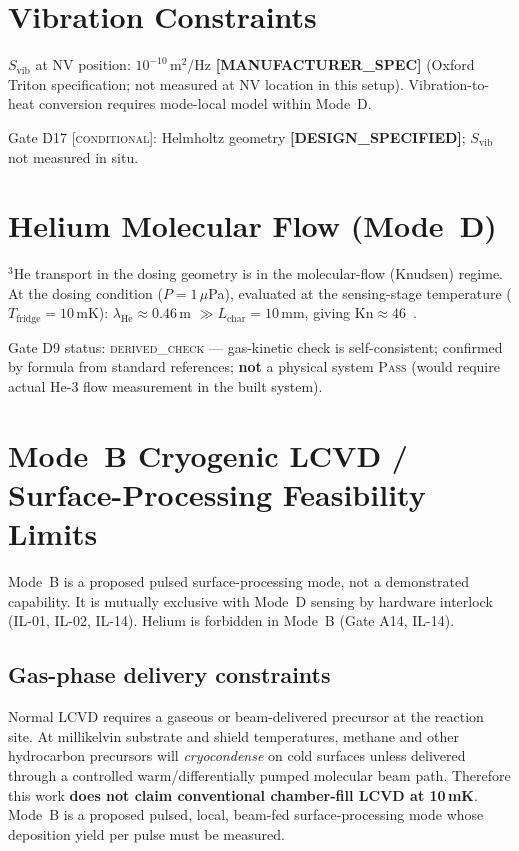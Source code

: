 \documentclass[12pt,a4paper]{article}
\newcommand{\conditional}{\textsc{conditional}}
\newcommand{\derivedcheck}{\textsc{derived\_check}}
\newcommand{\designspec}{\textbf{[DESIGN\_SPECIFIED]}}
\newcommand{\mfrspec}{\textbf{[MANUFACTURER\_SPEC]}}
\begin{document}
\section{Vibration Constraints}
\label{sec:vib}

$S_\mathrm{vib}$ at NV position: $10^{-10}$\,m$^2$/Hz \mfrspec{}
(Oxford Triton specification; not measured at NV location in this setup).
Vibration-to-heat conversion requires mode-local model within Mode~D.

Gate D17 [\conditional{}]: Helmholtz geometry \designspec{}; $S_\mathrm{vib}$ not measured in situ.

\section{Helium Molecular Flow (Mode~D)}
\label{sec:flow}

$^3$He transport in the dosing geometry is in the molecular-flow (Knudsen) regime.
At the dosing condition ($P = 1\,\mu$Pa), evaluated at the sensing-stage
temperature ($T_\mathrm{fridge} = 10$\,mK):
$\lambda_\mathrm{He} \approx 0.46$\,m $\gg L_\mathrm{char} = 10$\,mm,
giving $\mathrm{Kn} \approx 46$~\cite{Bird1994,Roth1990}.

Gate D9 status: \derivedcheck{} --- gas-kinetic check is self-consistent;
confirmed by formula from standard references; \textbf{not} a physical system
\textsc{Pass} (would require actual He-3 flow measurement in the built system).

\section{Mode~B Cryogenic LCVD / Surface-Processing Feasibility Limits}
\label{sec:lcvd}

Mode~B is a proposed pulsed surface-processing mode, not a demonstrated capability.
It is mutually exclusive with Mode~D sensing by hardware interlock (IL-01, IL-02, IL-14).
Helium is forbidden in Mode~B (Gate A14, IL-14).

\subsection*{Gas-phase delivery constraints}
Normal LCVD requires a gaseous or beam-delivered precursor at the reaction site.
At millikelvin substrate and shield temperatures, methane and other hydrocarbon
precursors will \emph{cryocondense} on cold surfaces unless delivered through a
controlled warm/differentially pumped molecular beam path. Therefore this work
\textbf{does not claim conventional chamber-fill LCVD at 10\,mK}.
Mode~B is a proposed pulsed, local, beam-fed surface-processing mode whose
deposition yield per pulse must be measured.
\end{document}
